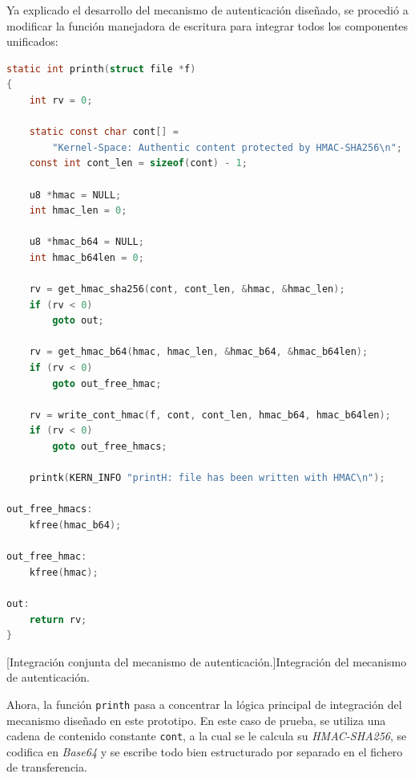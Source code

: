 Ya explicado el desarrollo del mecanismo de autenticación diseñado, se procedió a modificar la función manejadora de escritura para integrar todos los componentes unificados:

\begin{lstlisting}[language=C]
static int printh(struct file *f)
{
	int rv = 0;

	static const char cont[] =
		"Kernel-Space: Authentic content protected by HMAC-SHA256\n";
	const int cont_len = sizeof(cont) - 1;

	u8 *hmac = NULL;
	int hmac_len = 0;

	u8 *hmac_b64 = NULL;
	int hmac_b64len = 0;

	rv = get_hmac_sha256(cont, cont_len, &hmac, &hmac_len);
	if (rv < 0)
		goto out;

	rv = get_hmac_b64(hmac, hmac_len, &hmac_b64, &hmac_b64len);
	if (rv < 0)
		goto out_free_hmac;

	rv = write_cont_hmac(f, cont, cont_len, hmac_b64, hmac_b64len);
	if (rv < 0)
		goto out_free_hmacs;

	printk(KERN_INFO "printH: file has been written with HMAC\n");

out_free_hmacs:
	kfree(hmac_b64);

out_free_hmac:
	kfree(hmac);

out:
	return rv;
}
\end{lstlisting}
\captionsetup{type=code,justification=centering,singlelinecheck=false}
[Integración conjunta del mecanismo de autenticación.]{Integración del mecanismo de autenticación.}
\label{cod:crypto_printh}
\vspace{\baselineskip}

Ahora, la función \verb|printh| pasa a concentrar la lógica principal de integración del mecanismo diseñado en este prototipo.
En este caso de prueba, se utiliza una cadena de contenido constante \verb|cont|, a la cual se le calcula su \textit{HMAC-SHA256}, se codifica en \textit{Base64} y se escribe todo bien estructurado por separado en el fichero de transferencia.\\

